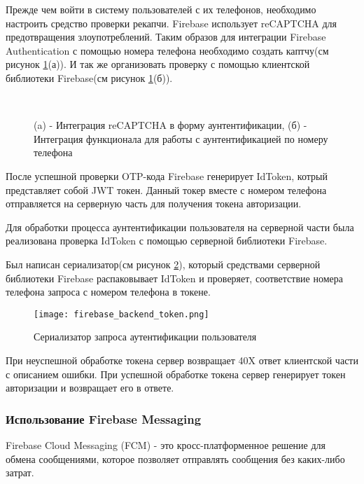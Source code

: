 Прежде чем войти в систему пользователей с их телефонов, необходимо настроить средство проверки рекапчи.
Firebase использует reCAPTCHA для предотвращения злоупотреблений.
Таким образов для интеграции Firebase Authentication с помощью номера телефона необходимо создать каптчу(см рисунок \ref{fire:captcha}(а)).
И так же организовать проверку с помощью клиентской библиотеки Firebase(см рисунок \ref{fire:captcha}(б)).


\begin{figure}[h]
    \centering
     \\
    \caption{ (a) - Интеграция reCAPTCHA в форму аунтентификации, (б) - Интеграция функционала для работы с аунтентификацией по номеру телефона }
    \label{fire:captcha}
\end{figure}


После успешной проверки OTP-кода Firebase генерирует IdToken, котрый представляет собой JWT токен.
Данный токер вместе с номером телефона отправляется на серверную часть для получения токена авторизации.

Для обработки процесса аунтентификации пользователя на серверной части была реализована проверка IdToken с помощью серверной библиотеки Firebase.


Был написан сериализатор(см рисунок \ref{server:seri}), который средствами серверной библиотеки Firebase распаковывает IdToken и проверяет, соответствие номера телефона запроса с номером телефона в токене.
\begin{figure}[h!]
    \centering
    \texttt{[image: firebase\_backend\_token.png]}
    \caption{ Сериализатор запроса аутентификации пользователя }
    \label{server:seri}
\end{figure}

При неуспешной обработке токена сервер возвращает 40X ответ клиентской части с описанием ошибки.
При успешной обработке токена сервер генерирует токен авторизации и возвращает его в ответе.

\subsubsection{Использование Firebase Messaging}\hfill

Firebase Cloud Messaging (FCM) - это кросс-платформенное решение для обмена сообщениями, которое позволяет  отправлять сообщения без каких-либо затрат.

